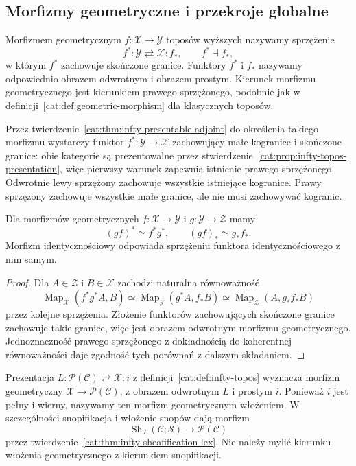 \subsection{Morfizmy geometryczne i przekroje globalne}

\begin{definicja}\label{cat:def:infty-geometric-morphism}
Morfizmem geometrycznym $f:\mathcal X\to\mathcal Y$ toposów wyższych nazywamy sprzężenie
\[
 f^*:\mathcal Y\rightleftarrows\mathcal X:f_*,
 \qquad f^*\dashv f_*,
\]
w którym $f^*$ zachowuje skończone granice. Funktory $f^*$ i $f_*$ nazywamy odpowiednio obrazem odwrotnym i obrazem prostym. Kierunek morfizmu geometrycznego jest kierunkiem prawego sprzężonego, podobnie jak w definicji~\ref{cat:def:geometric-morphism} dla klasycznych toposów.
\end{definicja}

Przez twierdzenie~\ref{cat:thm:infty-presentable-adjoint} do określenia takiego morfizmu wystarczy funktor $f^*:\mathcal Y\to\mathcal X$ zachowujący małe kogranice i skończone granice: obie kategorie są prezentowalne przez stwierdzenie~\ref{cat:prop:infty-topos-presentation}, więc pierwszy warunek zapewnia istnienie prawego sprzężonego. Odwrotnie lewy sprzężony zachowuje wszystkie istniejące kogranice. Prawy sprzężony zachowuje wszystkie małe granice, ale nie musi zachowywać kogranic.

\begin{stwierdzenie}\label{cat:prop:infty-geometric-composition}
Dla morfizmów geometrycznych $f:\mathcal X\to\mathcal Y$ i $g:\mathcal Y\to\mathcal Z$ mamy
\[
 (gf)^*\simeq f^*g^*,\qquad (gf)_*\simeq g_*f_*.
\]
Morfizm identycznościowy odpowiada sprzężeniu funktora identycznościowego z nim samym.
\end{stwierdzenie}
\begin{proof}
Dla $A\in\mathcal Z$ i $B\in\mathcal X$ zachodzi naturalna równoważność
\[
 \operatorname{Map}_{\mathcal X}(f^*g^*A,B)
 \simeq\operatorname{Map}_{\mathcal Y}(g^*A,f_*B)
 \simeq\operatorname{Map}_{\mathcal Z}(A,g_*f_*B)
\]
przez kolejne sprzężenia. Złożenie funktorów zachowujących skończone granice zachowuje takie granice, więc jest obrazem odwrotnym morfizmu geometrycznego. Jednoznaczność prawego sprzężonego z dokładnością do koherentnej równoważności daje zgodność tych porównań z dalszym składaniem.
\end{proof}

\begin{przyklad}\label{cat:ex:infty-geometric-inclusion}
Prezentacja $L:\mathcal P(\mathcal C)\rightleftarrows\mathcal X:i$ z definicji~\ref{cat:def:infty-topos} wyznacza morfizm geometryczny $\mathcal X\to\mathcal P(\mathcal C)$, z obrazem odwrotnym $L$ i prostym $i$. Ponieważ $i$ jest pełny i wierny, nazywamy ten morfizm geometrycznym włożeniem. W szczególności snopifikacja i włożenie snopów dają morfizm
\[
 \operatorname{Sh}_J(\mathcal C;\mathcal S)\longrightarrow\mathcal P(\mathcal C)
\]
przez twierdzenie~\ref{cat:thm:infty-sheafification-lex}. Nie należy mylić kierunku włożenia geometrycznego z kierunkiem snopifikacji.
\end{przyklad}

